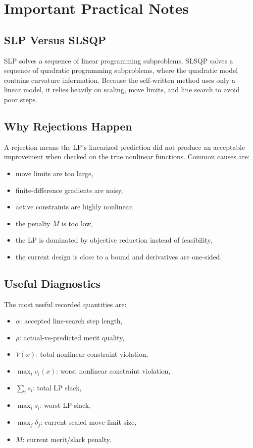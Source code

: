 \documentclass[11pt,a4paper]{article}
\begin{document}
\section{Important Practical Notes}

\subsection{SLP Versus SLSQP}

SLP solves a sequence of linear programming subproblems. SLSQP solves a sequence
of quadratic programming subproblems, where the quadratic model contains
curvature information. Because the self-written method uses only a linear model,
it relies heavily on scaling, move limits, and line search to avoid poor steps.

\subsection{Why Rejections Happen}

A rejection means the LP's linearized prediction did not produce an acceptable
improvement when checked on the true nonlinear functions. Common causes are:

\begin{itemize}[nosep]
    \item move limits are too large,
    \item finite-difference gradients are noisy,
    \item active constraints are highly nonlinear,
    \item the penalty \(M\) is too low,
    \item the LP is dominated by objective reduction instead of feasibility,
    \item the current design is close to a bound and derivatives are one-sided.
\end{itemize}

\subsection{Useful Diagnostics}

The most useful recorded quantities are:

\begin{itemize}[nosep]
    \item \(\alpha\): accepted line-search step length,
    \item \(\rho\): actual-vs-predicted merit quality,
    \item \(V(x)\): total nonlinear constraint violation,
    \item \(\max_i v_i(x)\): worst nonlinear constraint violation,
    \item \(\sum_i s_i\): total LP slack,
    \item \(\max_i s_i\): worst LP slack,
    \item \(\max_j \delta_j\): current scaled move-limit size,
    \item \(M\): current merit/slack penalty.
\end{itemize}
\end{document}
